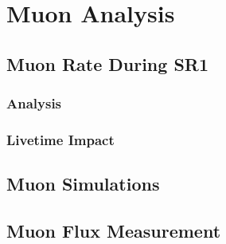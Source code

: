 \chapter{Muon Analysis}
\label{chpt:Muon_Anal}
\section{Muon Rate During SR1}
\subsection{Analysis}

\subsection{Livetime Impact}

\section{Muon Simulations}

\section{Muon Flux Measurement}